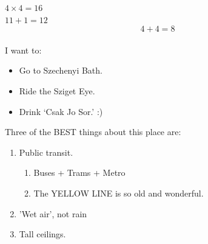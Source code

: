\documentclass{article}
\begin{document}
$4 \times 4 = 16$\\
$11 + 1 = 12$\\

$$4 + 4 = 8$$\\


I want to:
\begin{itemize}
\item Go to Szechenyi Bath.
\item Ride the Sziget Eye.
\item Drink `Csak Jo Sor.' :)
\end{itemize}

Three of the BEST things about this place are:
\begin{enumerate}
\item Public transit.
\begin{enumerate}
\item Buses + Trams + Metro
\item The YELLOW LINE is so old and wonderful.
\end{enumerate}
\item 'Wet air', not rain
\item Tall ceilings.
\end{enumerate}

\end{document}
